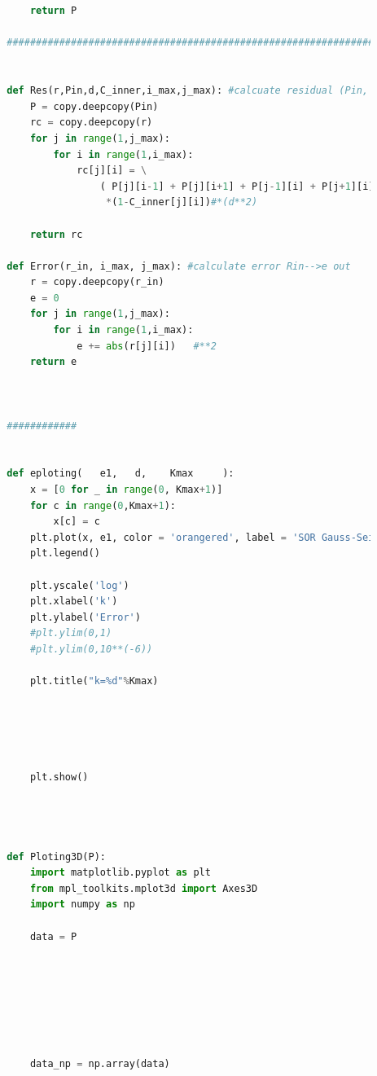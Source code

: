 \documentclass[12pt]{article}
\begin{document}
\begin{scriptsize}
\begin{lstlisting}[language=python,caption={Python code-Potential Flow}]
            
        
            return P
            
        ##########################################################################################
        
        
        def Res(r,Pin,d,C_inner,i_max,j_max): #calcuate residual (Pin, source)-->Rout
            P = copy.deepcopy(Pin)
            rc = copy.deepcopy(r)
            for j in range(1,j_max):
                for i in range(1,i_max): 
                    rc[j][i] = \
                        ( P[j][i-1] + P[j][i+1] + P[j-1][i] + P[j+1][i] - 4*P[j][i] )\ 
                         *(1-C_inner[j][i])#*(d**2)
        
            return rc
        
        def Error(r_in, i_max, j_max): #calculate error Rin-->e out
            r = copy.deepcopy(r_in)
            e = 0
            for j in range(1,j_max):
                for i in range(1,i_max): 
                    e += abs(r[j][i])   #**2
            return e
        
        
        
        ############
        
        
        def eploting(   e1,   d,    Kmax     ):
            x = [0 for _ in range(0, Kmax+1)]
            for c in range(0,Kmax+1):
                x[c] = c
            plt.plot(x, e1, color = 'orangered', label = 'SOR Gauss-Seidel(w=1)')
            plt.legend()
        
            plt.yscale('log')
            plt.xlabel('k')
            plt.ylabel('Error')
            #plt.ylim(0,1)
            #plt.ylim(0,10**(-6))
        
            plt.title("k=%d"%Kmax)
        
        
        
        
        
            plt.show()
        
        
        
        
        def Ploting3D(P):
            import matplotlib.pyplot as plt
            from mpl_toolkits.mplot3d import Axes3D
            import numpy as np
        
            data = P
        
        
        
        
        
        
        
            data_np = np.array(data)
        

\end{lstlisting}
\end{scriptsize}
\end{document}
